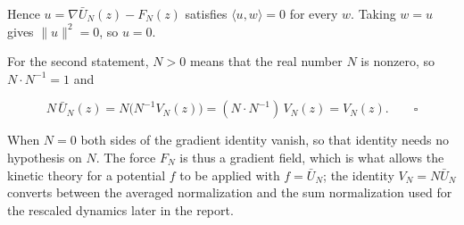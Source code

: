 \documentclass[11pt,a4paper]{article}
\begin{document}
Hence \(u=\nabla\bar U_N(z)-F_N(z)\) satisfies \(\langle u,w\rangle=0\) for every \(w\). Taking \(w=u\) gives \(\|u\|^2=0\), so \(u=0\).




For the second statement, \(N>0\) means that the real number \(N\) is nonzero, so \(N\cdot N^{-1}=1\) and


\[N\,\bar U_N(z)=N\bigl(N^{-1}V_N(z)\bigr)=(N\cdot N^{-1})\,V_N(z)=V_N(z).\qquad\square\]


When \(N=0\) both sides of the gradient identity vanish, so that identity needs no hypothesis on \(N\). The force \(F_N\) is thus a gradient field, which is what allows the kinetic theory for a potential \(f\) to be applied with \(f=\bar U_N\); the identity \(V_N=N\bar U_N\) converts between the averaged normalization and the sum normalization used for the rescaled dynamics later in the report.
\end{document}
